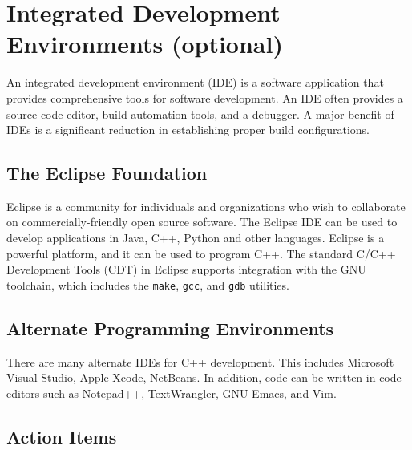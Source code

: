 \documentclass[11pt]{article}
\begin{document}
\newpage
\section{Integrated Development Environments (optional)}

An integrated development environment (IDE) is a software application that provides comprehensive tools for software development.
An IDE often provides a source code editor, build automation tools, and a debugger.
A major benefit of IDEs is a significant reduction in establishing proper build configurations.


\subsection*{The Eclipse Foundation}

Eclipse is a community for individuals and organizations who wish to collaborate on commercially-friendly open source software.
The Eclipse IDE can be used to develop applications in Java, C++, Python and other languages.
Eclipse is a powerful platform, and it can be used to program C++.
The standard C/C++ Development Tools (CDT) in Eclipse supports integration with the GNU toolchain, which includes the \texttt{make}, \texttt{gcc}, and \texttt{gdb} utilities.

\subsection*{Alternate Programming Environments}

There are many alternate IDEs for C++ development.
This includes Microsoft Visual Studio, Apple Xcode, NetBeans.
In addition, code can be written in code editors such as Notepad++, TextWrangler, GNU Emacs, and Vim.

\subsection*{Action Items}
\end{document}
